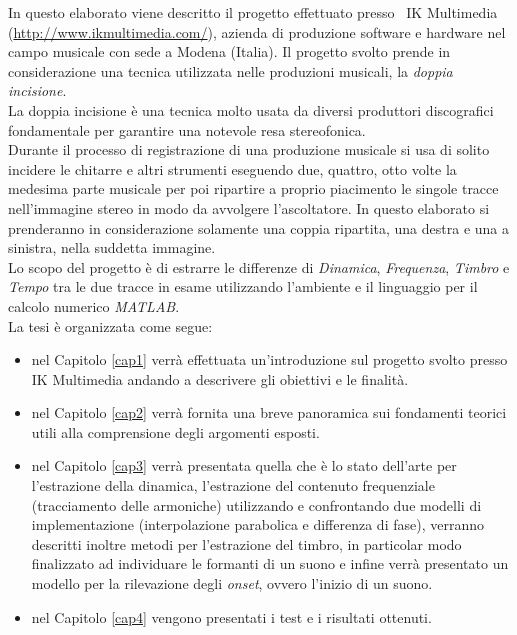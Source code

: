 \documentclass[12pt]{report}
\begin{document}
In questo elaborato viene descritto il progetto effettuato presso ~IK Multimedia (\url{http://www.ikmultimedia.com/}), azienda di produzione software e hardware nel campo musicale con sede a Modena (Italia). Il progetto svolto prende in considerazione una tecnica utilizzata nelle produzioni musicali, la {\itshape doppia incisione}.\\
La doppia incisione è una tecnica molto usata da diversi produttori discografici fondamentale per garantire una notevole resa stereofonica.\\
Durante il processo di registrazione di una produzione musicale si usa di solito incidere le chitarre e altri strumenti eseguendo due, quattro, otto volte la medesima parte musicale per poi ripartire a proprio piacimento le singole tracce nell'immagine stereo in modo da avvolgere l'ascoltatore. In questo elaborato si prenderanno in considerazione solamente una coppia ripartita, una destra e una a sinistra, nella suddetta immagine.\\
Lo scopo del progetto è di estrarre le differenze di {\itshape Dinamica}, {\itshape Frequenza}, {\itshape Timbro} e {\itshape Tempo} tra le due tracce in esame utilizzando l'ambiente e il linguaggio per il calcolo numerico {\itshape MATLAB}.\\

\label{organizzazione}
La tesi è organizzata come segue:
\begin{itemize}
\item nel Capitolo \ref{cap1} verrà effettuata un'introduzione sul progetto svolto presso IK Multimedia andando a descrivere gli obiettivi e le finalità.
\item nel Capitolo \ref{cap2} verrà fornita una breve panoramica sui fondamenti teorici utili alla comprensione degli argomenti esposti.
\item nel Capitolo \ref{cap3} verrà presentata quella che è lo stato dell'arte per l'estrazione della dinamica, l'estrazione del contenuto frequenziale (tracciamento delle armoniche) utilizzando e confrontando due modelli di implementazione (interpolazione parabolica e differenza di fase), verranno descritti inoltre metodi per l'estrazione del timbro, in particolar modo finalizzato ad individuare le formanti di un suono e infine verrà presentato un modello per la rilevazione degli {\itshape onset}, ovvero l'inizio di un suono.
\item nel Capitolo \ref{cap4} vengono presentati i test e i risultati ottenuti.
\end{itemize}
\end{document}
